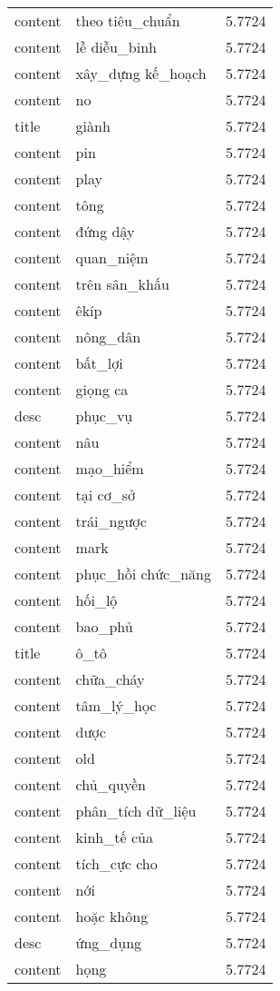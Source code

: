 \documentclass{article}
\begin{document}
\begin{tabular}{lll}
content & theo tiêu\_chuẩn & 5.7724\\
content & lễ diễu\_binh & 5.7724\\
content & xây\_dựng kế\_hoạch & 5.7724\\
content & no & 5.7724\\
title & giành & 5.7724\\
content & pin & 5.7724\\
content & play & 5.7724\\
content & tông & 5.7724\\
content & đứng dậy & 5.7724\\
content & quan\_niệm & 5.7724\\
content & trên sân\_khấu & 5.7724\\
content & êkíp & 5.7724\\
content & nông\_dân & 5.7724\\
content & bất\_lợi & 5.7724\\
content & giọng ca & 5.7724\\
desc & phục\_vụ & 5.7724\\
content & nâu & 5.7724\\
content & mạo\_hiểm & 5.7724\\
content & tại cơ\_sở & 5.7724\\
content & trái\_ngược & 5.7724\\
content & mark & 5.7724\\
content & phục\_hồi chức\_năng & 5.7724\\
content & hối\_lộ & 5.7724\\
content & bao\_phủ & 5.7724\\
title & ô\_tô & 5.7724\\
content & chữa\_cháy & 5.7724\\
content & tâm\_lý\_học & 5.7724\\
content & dược & 5.7724\\
content & old & 5.7724\\
content & chủ\_quyền & 5.7724\\
content & phân\_tích dữ\_liệu & 5.7724\\
content & kinh\_tế của & 5.7724\\
content & tích\_cực cho & 5.7724\\
content & nới & 5.7724\\
content & hoặc không & 5.7724\\
desc & ứng\_dụng & 5.7724\\
content & họng & 5.7724\\

\end{tabular}
\end{document}
